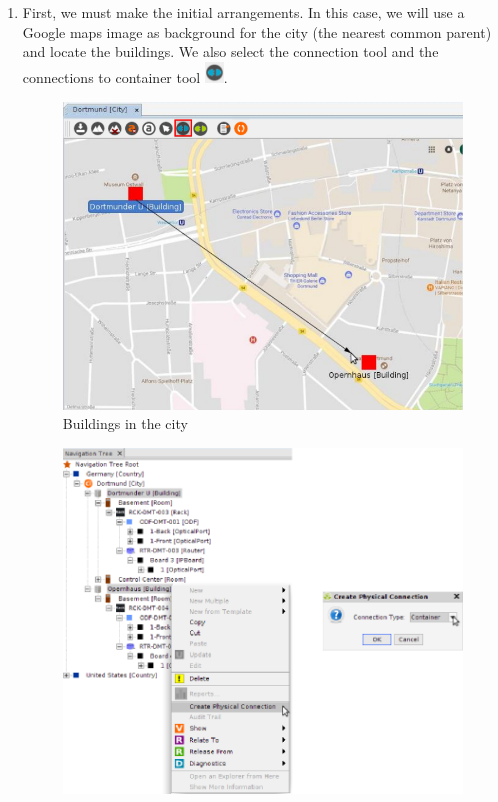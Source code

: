 \documentclass[a4paper]{article}
\begin{document}
			\begin{enumerate}
					\item First, we must make the initial arrangements. In this case, we will use a Google maps image as background for the city (the nearest common parent) and locate the buildings. We also select the connection tool and the connections to container tool \includegraphics[width=0.5cm]{img/object_view_container.png}.
					\begin{figure}[h!]
						\centering
						\includegraphics[width=\linewidth]{img/l1_example_2_initial_view.png}
						\caption{Buildings in the city}
						\label{fig:l1_example_2_initial_view}
					\end{figure}
					\begin{figure}[h!]
						\centering
						\includegraphics[width=0.7\linewidth]{img/actions_create_connection_container.png}

\end{figure}
\end{enumerate}
\end{document}
